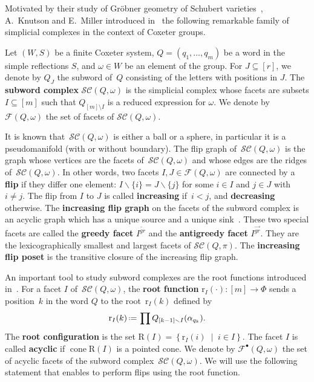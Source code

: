 \documentclass[reqno]{amsart}
\theoremstyle{definition}
\newcommand{\set}[2]{\left\{ #1 \;\middle|\; #2 \right\}} %
\newcommand{\ssm}{\smallsetminus} %
\newcommand{\eqdef}{\mbox{\,\raisebox{0.2ex}{\scriptsize\ensuremath{\mathrm:}}\ensuremath{=}\,}} %
\DeclareMathOperator{\cone}{cone} %
\newcommand{\defn}[1]{\textbf{\textsf{\color{PineGreen} #1}}} %
\newcommand{\subwordComplex}{\mathcal{SC}} %
\newcommand{\Roots}{\mathrm{R}} %
\newcommand{\rootFunction}[2]{\mathrm{r}_{#1}(#2)} %
\newcommand{\subwordFacets}{\mathcal{F}} %
\newcommand{\subwordAcyclicFacets}{\mathcal{F}^\bullet} %
\newcommand{\greedyFacet}{I^{\overleftarrow{gr}}} %
\newcommand{\antiGreedyFacet}{I^{\overrightarrow{gr}}} %
\begin{document}
Motivated by their study of Gröbner geometry of Schubert varieties~\cite{KnutsonMiller-GroebnerGeometry}, A.~Knutson and E.~Miller introduced in~\cite{KnutsonMiller-subwordComplex} the following remarkable family of simplicial complexes in the context of Coxeter groups.

Let $(W,S)$ be a finite Coxeter system, $Q=(q_1,\dots,q_m)$ be a word in the simple reflections $S$, and $\omega \in W$ be an element of the group.
For $J\subseteq [r]$, we denote by $Q_J$ the subword of~$Q$ consisting of the letters with positions in $J$.
The \defn{subword complex} $\subwordComplex(Q,\omega)$ is the simplicial complex whose facets are subsets $I\subseteq [m]$ such that $Q_{[m]\setminus I}$ is a reduced expression for $\omega$.
We denote by $\subwordFacets(Q,\omega)$ the set of facets of $\subwordComplex(Q,\omega)$.

It is known that~$\subwordComplex(Q,\omega)$ is either a ball or a sphere, in particular it is a pseudomanifold (with or without boundary).
The flip graph of~$\subwordComplex(Q,\omega)$ is the graph whose vertices are the facets of~$\subwordComplex(Q,\omega)$ and whose edges are the ridges of~$\subwordComplex(Q,\omega)$.
In other words, two facets $I,J \in \subwordFacets(Q,\omega)$ are connected by a \defn{flip} if they differ one element: $I \ssm \{i\} = J \ssm \{j\}$ for some $i\in I$ and $j\in J$ with~$i \ne j$.
The flip from $I$ to $J$ is called \defn{increasing} if~$i < j$, and \defn{decreasing} otherwise.
The \defn{increasing flip graph} on the facets of the subword complex is an acyclic graph which has a unique source and a unique sink~\cite{Pilaud-greedyFlipTree, PilaudStump-ELlabelings}.
These two special facets are called the \defn{greedy facet} $\greedyFacet$ and the \defn{antigreedy facet} $\antiGreedyFacet$.
They are the lexicographically smallest and largest facets of $\subwordComplex(Q,\pi)$.
The \defn{increasing flip poset} is the transitive closure of the increasing flip graph.

An important tool to study subword complexes are the root functions introduced in~\cite{CeballosLabbeStump}.
For a facet $I$ of~$\subwordComplex(Q,\omega)$, the \defn{root function} $\rootFunction{I}{\cdot}:[m]\rightarrow \Phi$ sends a position~$k$ in the word $Q$ to the root~$ \rootFunction{I}{k}$ defined by 
\[
\rootFunction{I}{k} \eqdef \prod Q_{[k-1]\ssm I}(\alpha_{q_k}).
\]
The \defn{root configuration} is the set $\Roots(I)=\set{\rootFunction{I}{i}}{i\in I}$.
The facet $I$ is called \defn{acyclic} if $\cone \Roots(I)$ is a pointed cone.
We denote by $\subwordAcyclicFacets(Q,\omega)$ the set of acyclic facets of the subword complex~$\subwordComplex(Q,\omega)$.
We will use the following statement that enables to perform flips using the root function.
\end{document}
